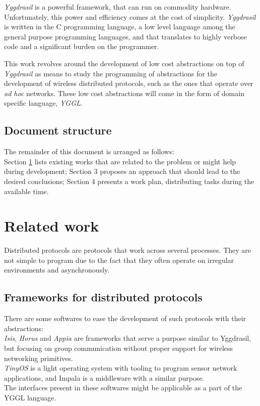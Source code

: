 \documentclass[runningheads]{llncs}
\begin{document}
\textit{Yggdrasil} is a powerful framework, that can run on commodity hardware. Unfortunately, this power and efficiency comes at the cost of simplicity.
\textit{Yggdrasil} is written in the C programming language, a low level language among the general purpose programming languages, and that translates to highly verbose code and a significant burden on the programmer.
\par This work revolves around the development of low cost abstractions on top of \textit{Yggdrasil} as means to study the programming of abstractions for the development of wireless distributed protocols, such as the ones that operate over \textit{ad hoc} networks.
These low cost abstractions will come in the form of domain specific language, \textit{YGGL}.
\subsection*{Document structure}
The remainder of this document is arranged as follows:\\
Section \ref{related} lists existing works that are related to the problem or might help during development; Section 3 proposes an approach that should lead to the desired conclusions; Section 4 presents a work plan, distributing tasks during the available time.

\section{Related work}
\label{related}
Distributed protocols are protocols that work across several processes. They are not simple to program due to the fact that they often operate on irregular environments and asynchronously.
\subsection*{Frameworks for distributed protocols}
There are some softwares to ease the development of such protocols with their abstractions:\\
\textit{Isis}\cite{ISIS:1990}, \textit{Horus}\cite{Horus:1994} and \textit{Appia}\cite{Appia:2001} are frameworks that serve a purpose similar to Yggdrasil, but focusing on group communication without proper support for wireless networking primitives.\\
\textit{TinyOS}\cite{TinyOS:2005} is a light operating system with tooling to program sensor network applications, and  Impala\cite{Impala:2003} is a middleware with a similar purpose.\\
The interfaces present in these softwares might be applicable as a part of the YGGL language.
\end{document}
